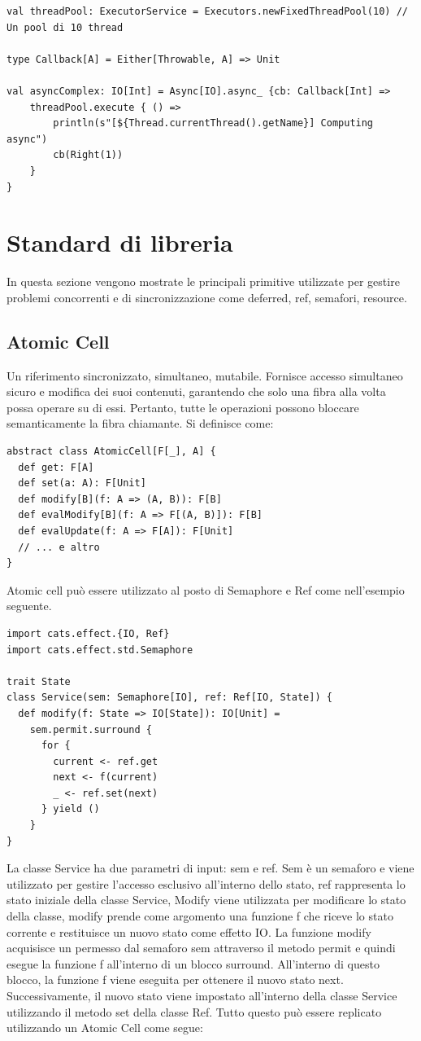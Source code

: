 \begin{verbatim}
val threadPool: ExecutorService = Executors.newFixedThreadPool(10) // Un pool di 10 thread

type Callback[A] = Either[Throwable, A] => Unit
    
val asyncComplex: IO[Int] = Async[IO].async_ {cb: Callback[Int] =>
    threadPool.execute { () =>
        println(s"[${Thread.currentThread().getName}] Computing async")
        cb(Right(1))
    }
}
\end{verbatim}

\section{Standard di libreria}
In questa sezione vengono mostrate le principali primitive utilizzate per
gestire problemi concorrenti e di sincronizzazione come deferred, ref, semafori, resource.

\subsection{Atomic Cell}
Un riferimento sincronizzato, simultaneo, mutabile. Fornisce accesso simultaneo sicuro e modifica dei suoi contenuti, garantendo che solo una fibra alla volta possa operare su di essi. Pertanto, tutte le operazioni possono bloccare semanticamente la fibra chiamante. Si definisce come:
\begin{verbatim}
abstract class AtomicCell[F[_], A] {
  def get: F[A]
  def set(a: A): F[Unit]
  def modify[B](f: A => (A, B)): F[B]
  def evalModify[B](f: A => F[(A, B)]): F[B]
  def evalUpdate(f: A => F[A]): F[Unit]
  // ... e altro
}
\end{verbatim}
\noindent Atomic  cell può essere utilizzato al posto di Semaphore e Ref come nell'esempio seguente.
\begin{verbatim}
import cats.effect.{IO, Ref}
import cats.effect.std.Semaphore

trait State
class Service(sem: Semaphore[IO], ref: Ref[IO, State]) {
  def modify(f: State => IO[State]): IO[Unit] = 
    sem.permit.surround {
      for {
        current <- ref.get
        next <- f(current)
        _ <- ref.set(next) 
      } yield ()
    }
}

\end{verbatim}

\noindent La classe Service ha due parametri di input: sem e ref. Sem è un semaforo e viene utilizzato per gestire l'accesso esclusivo all'interno dello stato, ref rappresenta lo stato iniziale della classe Service, Modify viene utilizzata per modificare lo stato della classe, modify prende come argomento una funzione f che riceve lo stato corrente e restituisce un nuovo stato come effetto IO. La funzione modify acquisisce un permesso dal semaforo sem attraverso il metodo permit e quindi esegue la funzione f all'interno di un blocco surround. All'interno di questo blocco, la funzione f viene eseguita per ottenere il nuovo stato next. Successivamente, il nuovo stato viene impostato all'interno della classe Service utilizzando il metodo set della classe Ref. Tutto questo può essere replicato utilizzando un Atomic Cell come segue:

